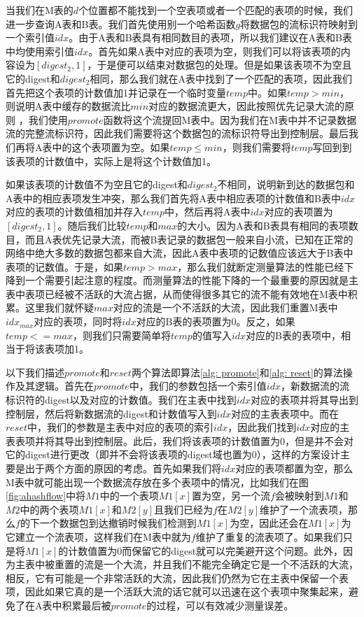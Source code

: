 \documentclass{article}
\begin{document}
当我们在M表的$d$个位置都不能找到一个空表项或者一个匹配的表项的时候，我们进一步查询A表和B表。我们首先使用别一个哈希函数$g$将数据包的流标识符映射到一个索引值$idx$。由于A表和B表具有相同数目的表项，所以我们建议在A表和B表中均使用索引值$idx$。首先如果A表中对应的表项为空，则我们可以将该表项的内容设为$[digest_2, 1]$，于是便可以结束对数据包的处理。但是如果该表项不为空且它的digest和$digest_2$相同，那么我们就在A表中找到了一个匹配的表项，因此我们首先把这个表项的计数值加1并记录在一个临时变量$temp$中。如果$temp > min$，则说明A表中缓存的数据流比$min$对应的数据流更大，因此按照优先记录大流的原则 ，我们使用$promote$函数将这个流提回M表中。因为我们在M表中并不记录数据流的完整流标识符，因此我们需要将这个数据包的流标识符导出到控制层。最后我们再将A表中的这个表项置为空。如果$temp \le min$，则我们需要将$temp$写回到到该表项的计数值中，实际上是将这个计数值加1。

如果该表项的计数值不为空且它的digest和$digest_2$不相同，说明新到达的数据包和A表中的相应表项发生冲突，那么我们首先将A表中相应表项的计数值和B表中$idx$对应的表项的计数值相加并存入$temp$中，然后再将A表中$idx$对应的表项置为$[digest_2, 1]$。随后我们比较$temp$和$max$的大小。因为A表和B表具有相同的表项数目，而且A表优先记录大流，而被B表记录的数据包一般来自小流，已知在正常的网络中绝大多数的数据包都来自大流，因此A表中表项的记数值应该远大于B表中表项的记数值。于是，如果$temp>max$，那么我们就断定测量算法的性能已经下降到一个需要引起注意的程度。而测量算法的性能下降的一个最重要的原因就是主表中表项已经被不活跃的大流占据，从而使得很多其它的流不能有效地在M表中积累。这里我们就怀疑$max$对应的流是一个不活跃的大流，因此我们重置M表中$idx_{max}$对应的表项，同时将$idx$对应的B表的表项置为0。反之，如果$temp <= max$，则我们只需要简单将$temp$的值写入$idx$对应的B表的表项中，相当于将该表项加1。


以下我们描述$promote$和$reset$两个算法即算法\ref{alg: promote}和\ref{alg: reset}的算法操作及其逻辑。首先在$promote$中，我们的参数包括一个索引值$idx$，新数据流的流标识符的digest以及对应的计数值。我们在主表中找到$idx$对应的表项并将其导出到控制层，然后将新数据流的digest和计数值写入到$idx$对应的主表表项中。而在$reset$中，我们的参数是主表中对应的表项的索引$idx$，因此我们找到$idx$对应的主表表项并将其导出到控制层。此后，我们将该表项的计数值置为0，但是并不会对它的digest进行更改（即并不会将该表项的digest域也置为0），这样的方案设计主要是出于两个方面的原因的考虑。首先如果我们将$idx$对应的表项都置为空，那么M表中就可能出现一个数据流存放在多个表项中的情况，比如我们在图\ref{fig:ahashflow}中将$M1$中的一个表项$M1[x]$置为空，另一个流$f$会被映射到$M1$和$M2$中的两个表项$M1[x]$和$M2[y]$且我们已经为$f$在$M2[y]$维护了一个流表项，那么$f$的下一个数据包到达撤销时候我们检测到$M1[x]$为空，因此还会在$M1[x]$为它建立一个流表项，这样我们在M表中就为$f$维护了重复的流表项了。如果我们只是将$M1[x]$的计数值置为0而保留它的digest就可以完美避开这个问题。此外，因为主表中被重置的流是一个大流，并且我们不能完全确定它是一个不活跃的大流，相反，它有可能是一个非常活跃的大流，因此我们仍然为它在主表中保留一个表项，因此如果它真的是一个活跃大流的话它就可以迅速在这个表项中聚集起来，避免了在A表中积累最后被$promote$的过程，可以有效减少测量误差。
\end{document}
